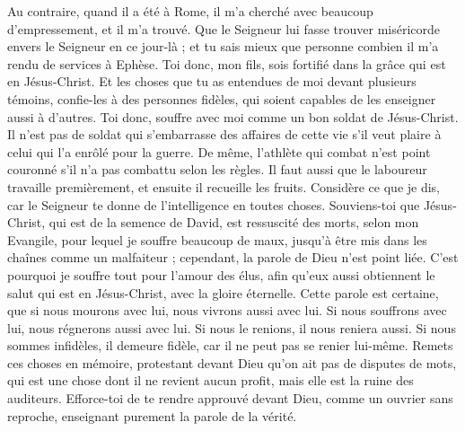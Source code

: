 \begin{multicols}{2}
Au contraire, quand il a été à Rome, il m'a cherché avec beaucoup d'empressement, et il m'a trouvé.
Que le Seigneur lui fasse trouver miséricorde envers le Seigneur en ce jour-là ; et tu sais mieux que personne combien il m'a rendu de services à Ephèse.
\VerseOne{}Toi donc, mon fils, sois fortifié dans la grâce qui est en Jésus-Christ.
Et les choses que tu as entendues de moi devant plusieurs témoins, confie-les à des personnes fidèles, qui soient capables de les enseigner aussi à d'autres.
Toi donc, souffre avec moi comme un bon soldat de Jésus-Christ.
Il n'est pas de soldat qui s'embarrasse des affaires de cette vie s'il veut plaire à celui qui l'a enrôlé pour la guerre.
De même, l'athlète qui combat n'est point couronné s'il n'a pas combattu selon les règles.
Il faut aussi que le laboureur travaille premièrement, et ensuite il recueille les fruits.
Considère ce que je dis, car le Seigneur te donne de l'intelligence en toutes choses.
Souviens-toi que Jésus-Christ, qui est de la semence de David, est ressuscité des morts, selon mon Evangile,
pour lequel je souffre beaucoup de maux, jusqu'à être mis dans les chaînes comme un malfaiteur ; cependant, la parole de Dieu n'est point liée.
C'est pourquoi je souffre tout pour l'amour des élus, afin qu'eux aussi obtiennent le salut qui est en Jésus-Christ, avec la gloire éternelle.
Cette parole est certaine, que si nous mourons avec lui, nous vivrons aussi avec lui.
Si nous souffrons avec lui, nous régnerons aussi avec lui. Si nous le renions, il nous reniera aussi.
Si nous sommes infidèles, il demeure fidèle, car il ne peut pas se renier lui-même.
Remets ces choses en mémoire, protestant devant Dieu qu'on ait pas de disputes de mots, qui est une chose dont il ne revient aucun profit, mais elle est la ruine des auditeurs.
Efforce-toi de te rendre approuvé devant Dieu, comme un ouvrier sans reproche, enseignant purement la parole de la vérité.

\end{multicols}
